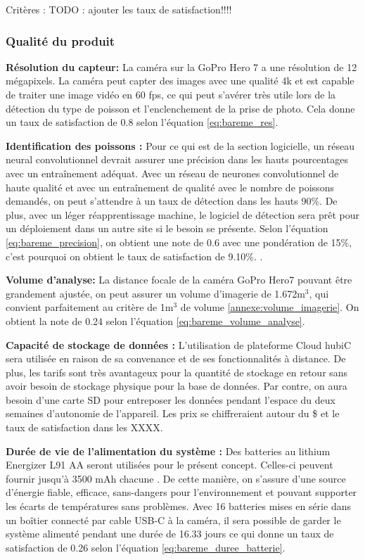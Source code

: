Critères :
TODO : ajouter les taux de satisfaction!!!!

\subsubsection{Qualité du produit}


\textbf{Résolution du capteur: } La caméra sur la GoPro Hero 7 a une résolution de 12 mégapixels. La caméra peut capter des images avec une qualité 4k et est capable de traiter une image vidéo en 60 fps, ce qui peut s’avérer très utile lors de la détection du type de poisson et l’enclenchement de la prise de photo. Cela donne un taux de satisfaction de 0.8 selon l'équation \ref{eq:bareme_res}.

\textbf{Identification des poissons :}
Pour ce qui est de la section logicielle, un réseau neural convolutionnel devrait assurer une précision dans les hauts pourcentages avec un entraînement adéquat. Avec un réseau de neurones convolutionnel de haute qualité et avec un entraînement de qualité avec le nombre de poissons demandés, on peut s’attendre à un taux de détection dans les hauts 90\%. De plus, avec un léger réapprentissage machine, le logiciel de détection sera prêt pour un déploiement dans un autre site si le besoin se présente. Selon l’équation \ref{eq:bareme_precision}, on obtient une note de 0.6 avec une pondération de 15\%, c’est pourquoi on obtient le taux de satisfaction de 9.10\%. \cite{neural_yt}.


\textbf{Volume d'analyse:} La distance focale de la caméra GoPro Hero7 pouvant être grandement ajustée, on peut assurer un volume d’imagerie de 1.672m$^3$, qui convient parfaitement au critère de 1m$^3$ de volume \ref{annexe:volume_imagerie}.  On obtient la note de 0.24 selon l'équation \ref{eq:bareme_volume_analyse}.


\textbf{Capacité de stockage de données :}
L’utilisation de plateforme Cloud hubiC sera utilisée en raison de sa convenance et de ses fonctionnalités à distance. De plus, les tarifs sont très avantageux pour la quantité de stockage en retour sans avoir besoin de stockage physique pour la base de données. Par contre, on aura besoin d’une carte SD pour entreposer les données pendant l’espace du deux semaines d’autonomie de l’appareil. Les prix se chiffreraient autour du \$ et le taux de satisfaction dans les XXXX. 


\textbf{Durée de vie de l’alimentation du système :}
Des batteries au lithium Energizer L91 AA seront utilisées pour le présent concept. Celles-ci peuvent fournir jusqu'à 3500 mAh chacune \cite{Energizer}. De cette manière, on s’assure d’une source d’énergie fiable, efficace, sans-dangers pour l’environnement et pouvant supporter les écarts de températures sans problèmes. Avec 16 batteries mises en série dans un boîtier connecté par cable USB-C à la caméra, il sera possible de garder le système alimenté pendant une durée de 16.33 jours ce qui donne un taux de satisfaction de 0.26 selon l'équation \ref{eq:bareme_duree_batterie}.


